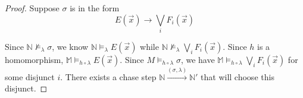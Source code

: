 		\begin{proof}

%
%
%
%

			Suppose $\sigma$ is in the form
				\[E(\vec{x}) \to \bigvee_i F_i(\vec{x})\]

			Since $\mathbb{N} \not\models_\lambda \sigma$, we know $\mathbb{N}
			\models_\lambda E(\vec{x})$ while $\mathbb{N} \not\models_\lambda
			\bigvee_i F_i(\vec{x})$. Since $h$ is a homomorphism, $\mathbb{M}
			\models_{h\circ\lambda} E(\vec{x})$. Since $M
			\models_{h\circ\lambda} \sigma$, we have $\mathbb{M}
			\models_{h\circ\lambda} \bigvee_i F_i(\vec{x})$ for some disjunct
			$i$. There exists a chase step $\mathbb{N}
			\xrightarrow{(\sigma,\lambda)} \mathbb{N}'$ that will choose this
			disjunct.


\end{proof}
